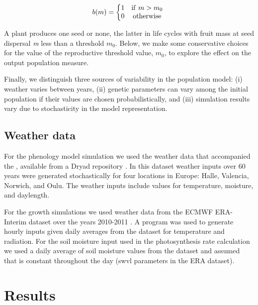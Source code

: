 \[b( m ) = \left\{ \begin{matrix}
1 & \mathrm{if\ }m > m_{0} \\
0 & \mathrm{otherwise} \\
\end{matrix} \right.\ \]

A plant produces one seed or none, the latter in life cycles with fruit
mass at seed dispersal \emph{m} less than a threshold \(m_{0}\). Below,
we make some conservative choices for the value of the reproductive
threshold value, \(m_{0}\), to explore the effect on the output
population measure.

Finally, we distinguish three sources of variability in the population
model: (i) weather varies between years, (ii) genetic parameters can
vary among the initial population if their values are chosen
probabilistically, and (iii) simulation results vary due to
stochasticity in the model representation.

\subsection{Weather data}
\label{weather-data}

For the phenology model simulation we used the weather data that accompanied the
\citet{burghardt_modeling_2015}, available from a Dryad repository
\citep{burghardt_data_2014}. In this dataset weather inputs over 60 years were
generated stochastically for four locations in Europe: Halle, Valencia, Norwich,
and Oulu. The weather inputs include values for temperature, moisture, and
daylength.

For the growth simulations we used weather data from the ECMWF ERA-Interim
dataset over the years 2010-2011 \citep{dee_era-interim_2011}.  A program was
used to generate hourly inputs given daily averages from the dataset for
temperature and radiation. For the soil moisture input used in the
photosynthesis rate calculation we used a daily average of soil moisture values
from the dataset and assumed that is constant throughout the day (swvl
parameters in the ERA dataset).

\section{Results}
\label{results}

